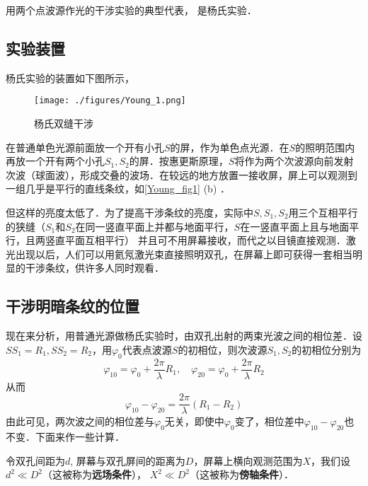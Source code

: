 

用两个点波源作光的干涉实验的典型代表， 是杨氏实验．
\subsection{实验装置}
杨氏实验的装置如下图所示，
\begin{figure}[ht]
\centering
\texttt{[image: ./figures/Young\_1.png]}
\caption{杨氏双缝干涉} \label{Young_fig1}
\end{figure}
在普通单色光源前面放一个开有小孔$S$的屏，作为单色点光源．在$S $的照明范围内再放一个开有两个小孔$S_1,S_2$的屏．按惠更斯原理，$S$将作为两个次波源向前发射次波（球面波），形成交叠的波场．在较远的地方放置一接收屏，屏上可以观测到一组几乎是平行的直线条纹，如\autoref{Young_fig1} (b) ．

但这样的亮度太低了．为了提高干涉条纹的亮度，实际中$S,S_1,S_2$用三个互相平行的狭缝（$S_1$和$S_2$在同一竖直平面上并都与地面平行，$S$在一竖直平面上且与地面平行，且两竖直平面互相平行）
并且可不用屏幕接收，而代之以目镜直接观测．激光出现以后，人们可以用氦氖激光束直接照明双孔，在屏幕上即可获得一套相当明显的干涉条纹，供许多人同时观看．

\subsection{干涉明暗条纹的位置}
现在来分析，用普通光源做杨氏实验时，由双孔出射的两束光波之间的相位差．设$SS_1=R_1,SS_2=R_2$，用$\varphi_0$代表点波源$S$的初相位，则次波源$S_1,S_2$的初相位分别为
\begin{equation}
\varphi_{10}=\varphi_{0}+\frac{2 \pi}{\lambda} R_{1}, \quad \varphi_{20}=\varphi_{0}+\frac{2 \pi}{\lambda} R_{2}
\end{equation}
从而
\begin{equation}
\varphi_{10}-\varphi_{20}=\frac{2 \pi}{\lambda}\left(R_{1}-R_{2}\right)
\end{equation}
由此可见，两次波之间的相位差与$\varphi_0$无关，即使中$\varphi_0$变了，相位差中$\varphi_{10}-\varphi_{20}$也不变．下面来作一些计算．

令双孔间距为$d$, 屏幕与双孔屏间的距离为$D$，屏幕上横向观测范围为$X$，我们设$d^{2} \ll D^{2}$（这被称为\textbf{远场条件}）， $X^{2} \ll D^{2}$（这被称为\textbf{傍轴条件}）．

